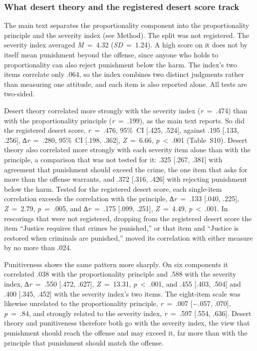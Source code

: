\subsubsection{What desert theory and the registered desert score track}\label{what-desert-theory-and-the-registered-desert-score-track}

The main text separates the proportionality component into the proportionality principle and the severity index (see Method). The split was not registered. The severity index averaged \emph{M}~=~4.32 (\emph{SD}~=~1.24). A high score on it does not by itself mean punishment beyond the offense, since anyone who holds to proportionality can also reject punishment below the harm. The index's two items correlate only .064, so the index combines two distinct judgments rather than measuring one attitude, and each item is also reported alone. All tests are two-sided.

Desert theory correlated more strongly with the severity index (\emph{r}~=~.474) than with the proportionality principle (\emph{r}~=~.199), as the main text reports. So did the registered desert score, \emph{r}~=~.476, 95\%~CI {[}.425, .524{]}, against .195 {[}.133, .256{]}, ∆\emph{r}~=~.280, 95\%~CI {[}.198, .362{]}, \emph{Z}~=~6.66, \emph{p}~\textless{}~.001 (Table~S10). Desert theory also correlated more strongly with each severity item alone than with the principle, a comparison that was not tested for it: .325 {[}.267, .381{]} with agreement that punishment should exceed the crime, the one item that asks for more than the offense warrants, and .372 {[}.316, .426{]} with rejecting punishment below the harm. Tested for the registered desert score, each single-item correlation exceeds the correlation with the principle, ∆\emph{r}~=~.133 {[}.040, .225{]}, \emph{Z}~=~2.79, \emph{p}~=~.005, and ∆\emph{r}~=~.175 {[}.099, .251{]}, \emph{Z}~=~4.49, \emph{p}~\textless{}~.001. In rescorings that were not registered, dropping from the registered desert score the item ``Justice requires that crimes be punished,'' or that item and ``Justice is restored when criminals are punished,'' moved its correlation with either measure by no more than .024.

Punitiveness shows the same pattern more sharply. On six components it correlated .038 with the proportionality principle and .588 with the severity index, ∆\emph{r}~=~.550 {[}.472, .627{]}, \emph{Z}~=~13.31, \emph{p}~\textless{}~.001, and .455 {[}.403, .504{]} and .400 {[}.345, .452{]} with the severity index's two items. The eight-item scale was likewise unrelated to the proportionality principle, \emph{r}~=~.007 {[}−.057, .070{]}, \emph{p}~=~.84, and strongly related to the severity index, \emph{r}~=~.597 {[}.554, .636{]}. Desert theory and punitiveness therefore both go with the severity index, the view that punishment should reach the offense and may exceed it, far more than with the principle that punishment should match the offense.

